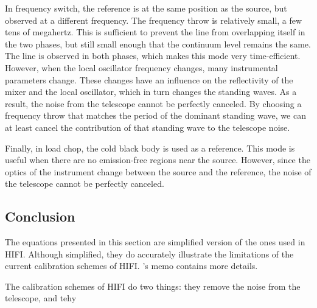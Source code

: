 In frequency switch, the reference is at the same position as the source, but observed at a different frequency.
The frequency throw is relatively small, a few tens of megahertz.
This is sufficient to prevent the line from overlapping itself in the two phases, but still small enough that the continuum level remains the same.
The line is observed in both phases, which makes this mode very time-efficient.
However, when the local oscillator frequency changes, many instrumental parameters change.
These changes have an influence on the reflectivity of the mixer and the local oscillator, which in turn changes the standing waves.
As a result, the noise from the telescope cannot be perfectly canceled.
By choosing a frequency throw that matches the period of the dominant standing wave, we can at least cancel the contribution of that standing wave to the telescope noise.

Finally, in load chop, the cold black body is used as a reference.
This mode is useful when there are no emission-free regions near the source.
However, since the optics of the instrument change between the source and the reference, the noise of the telescope cannot be perfectly canceled.

\subsection{Conclusion}
The equations presented in this section are simplified version of the ones used in HIFI.
Although simplified, they do accurately illustrate the limitations of the current calibration schemes of HIFI.
\citeauthor{ossenkopf2002intensity}'s memo \cite{ossenkopf2002intensity} contains more details.

The calibration schemes of HIFI do two things: they remove the noise from the telescope, and tehy 


